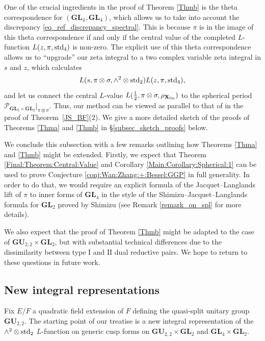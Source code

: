 \documentclass[11pt, reqno]{amsart}
\theoremstyle{plain}
\theoremstyle{definition}
\theoremstyle{remark}
\theoremstyle{plain}
\def\GU{{\mathbf{GU}}}
\def\GL{\mathbf{GL}}
\begin{document}
 One of the crucial ingredients in the proof of Theorem \ref{Thmb} is the theta correspondence for $(\GL_4,\GL_4)$, which allows us to take into account the discrepancy \eqref{eq_ref_discrepancy_spectral}. This is because $\pi$ is in the image of this theta correspondence if and only if the central value of the completed $L$-function $L(z, \pi , {\rm std}_4) $ is non-zero. The explicit use of this theta correspondence allows us to ``upgrade'' our zeta integral to a two complex variable zeta integral in $s$ and $z$, which calculates $$ L(s,\pi\otimes\sigma,\wedge^2\otimes\mathrm{std}_2)L(z, \pi , {\rm std}_4),$$
 and let us connect the central $L$-value $L( \tfrac{1}{2}, \pi \otimes \sigma, \rho_{\mathbf{X}_{\rm lin}})$ to the spherical period  ${\mathcal{P}_{ \GL_2 \times \GL_2}}|_{\pi \otimes \sigma}$. Thus, our method can be viewed as parallel to that of \cite{BumpFriedberg} in the proof of Theorem~\ref{JS_BF}(2). We give a more detailed sketch of the proofs of Theorems \ref{Thma} and \ref{Thmb} in \S \ref{subsec_sketch_proofs} below. 

 
 We conclude this subsection with a few remarks outlining how Theorems \ref{Thma} and \ref{Thmb} might be extended. Firstly, we expect that Theorem \ref{Final:Theorem:Central:Value} and Corollary \ref{Main:Corollary:Spherical:1} can be used to prove Conjecture \ref{conj:Wan:Zhang:+:Bessel:GGP} in full generality. In order to do that, we would require an explicit formula of the Jacquet--Langlands lift of $\pi$ to inner forms of $\GL_4$ in the style of the Shimizu--Jacquet--Langlands formula for $\GL_2$ proved by Shimizu \cite{Shimizu:JL} (see Remark \ref{remark_on_spl} for more details). 
 

\noindent We also expect that the proof of Theorem \ref{Thmb} might be adapted to the case of $\GU_{2,2} \times \GL_2$, but with substantial technical differences due to the dissimilarity between type $\mathrm{I}$ and $\mathrm{II}$ dual reductive pairs. We hope to return to these questions in future work.

\subsection{New integral representations}\label{Section:2:intro}
Fix $E/F$ a quadratic field extension of $F$ defining the quasi-split unitary group $\GU_{2,2}$. The starting point of our treatise is a new integral representation of the $\wedge^2  \otimes {\rm std}_2$ $L$-function on generic cusp forms on $\GU_{2,2}\times \GL_2$ and $\GL_4 \times \GL_2$. 
\end{document}
